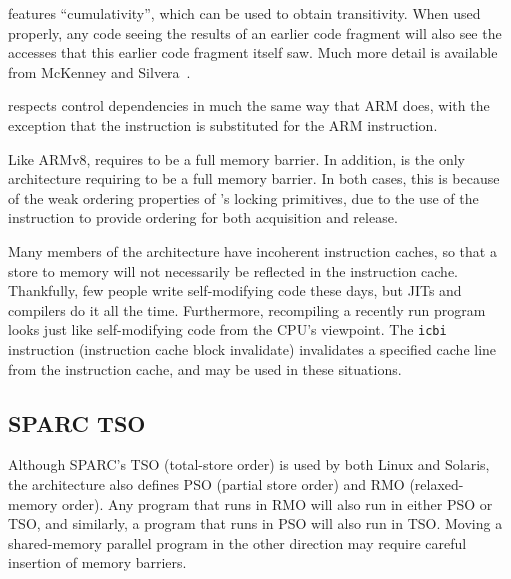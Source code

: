 \Power{} features ``cumulativity'', which can be used to obtain
transitivity.
When used properly, any code seeing the results of an earlier
code fragment will also see the accesses that this earlier code
fragment itself saw.
Much more detail is available from
McKenney and Silvera~\cite{PaulEMcKenneyN2745r2009}.

\Power{} respects control dependencies in much the same way that ARM
does, with the exception that the \Power{}  instruction
is substituted for the ARM  instruction.

Like ARMv8, \Power{} requires  to be
a full memory barrier.
In addition, \Power{} is the only architecture requiring
 to be a full memory barrier.
In both cases, this is because of the weak ordering properties
of \Power{}'s locking primitives, due to the use of the 
instruction to provide ordering for both acquisition and release.

Many members of the \Power{} architecture have incoherent instruction
caches, so that a store to memory will not necessarily be reflected
in the instruction cache.
Thankfully, few people write self-modifying code these days, but JITs
and compilers do it all the time.
Furthermore, recompiling a recently run program looks just like
self-modifying code from the CPU's viewpoint.
The {\tt icbi} instruction (instruction cache block invalidate)
invalidates a specified cache line from
the instruction cache, and may be used in these situations.

\subsection{SPARC TSO}

Although SPARC's TSO (total-store order) is used by both Linux and
Solaris, the architecture also defines PSO (partial store order) and RMO
(relaxed-memory order).
Any program that runs in RMO will also run in either PSO or TSO, and similarly,
a program that runs in PSO will also run in TSO.
Moving a shared-memory parallel program in the other direction may
require careful insertion of memory barriers.

